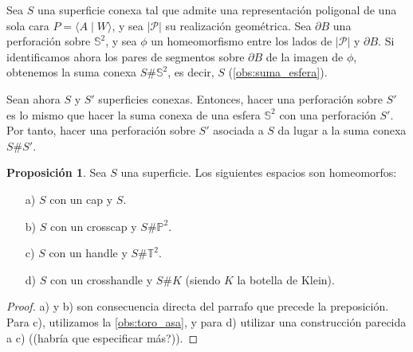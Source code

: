 \documentclass[10pt]{report}
\newcommand{\Esfera}{\mathbb{S}^2}
\newcommand{\Toro}{\mathbb{T}^2}
\newcommand{\Proyectivo}{\mathbb{P}^2}
\theoremstyle{definition}
\newtheorem{prop}[defin]{Proposición}
\begin{document}
Sea $S$ una superficie conexa tal que admite una representación poligonal de una sola cara $P=\langle A\mid W\rangle$, y sea $|\mathcal{P}|$ su realización geométrica. Sea $\partial B$ una perforación sobre $\Esfera$, y sea $\phi$ un homeomorfismo entre los lados de $|\mathcal{P}|$ y $\partial B$. Si identificamos ahora los pares de segmentos sobre $\partial B$ de la imagen de $\phi$, obtenemos la suma conexa $S\# \Esfera$, es decir, $S$ (\autoref{obs:suma_esfera}). 

Sean ahora $S$ y $S'$ superficies conexas. Entonces, hacer una perforación sobre $S'$ es lo mismo que hacer la suma conexa de una esfera $\Esfera$ con una perforación $S'$. Por tanto, hacer una perforación sobre $S'$ asociada a $S$ da lugar a la suma conexa $S\# S'$.
 

\begin{prop}
Sea $S$ una superficie. Los siguientes espacios son homeomorfos:
\begin{itemize}
\item[a)] $S$ con un cap y $S$.
\item[b)] $S$ con un crosscap y $S\# \Proyectivo$.
\item[c)] $S$ con un handle y $S\# \Toro$.
\item[d)] $S$ con un crosshandle y $S\# K$ (siendo $K$ la botella de Klein). 
\end{itemize}
\end{prop}
\begin{proof}
a) y b) son consecuencia directa del parrafo que precede la preposición. Para c), utilizamos la \autoref{obs:toro_asa}, y para d) utilizar una construcción parecida a c) ((habría que especificar más?)).
\end{proof}
\end{document}
